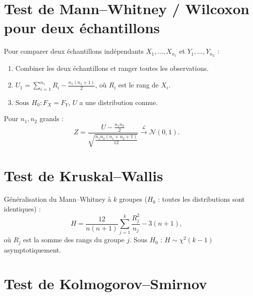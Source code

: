 \section{Test de Mann--Whitney / Wilcoxon pour deux \'echantillons}

\begin{definition}
Pour comparer deux \'echantillons ind\'ependants $X_1,\ldots,X_{n_1}$ et $Y_1,\ldots,Y_{n_2}$ :
\begin{enumerate}
\item Combiner les deux \'echantillons et ranger toutes les observations.
\item $U_1=\sum_{i=1}^{n_1} R_i - \frac{n_1(n_1+1)}{2}$, o\`u $R_i$ est le rang de $X_i$.
\item Sous $H_0:F_X=F_Y$, $U$ a une distribution connue.
\end{enumerate}
\end{definition}

\begin{theoreme}
Pour $n_1,n_2$ grands :
\[
Z = \frac{U-\frac{n_1 n_2}{2}}{\sqrt{\frac{n_1 n_2(n_1+n_2+1)}{12}}} \xrightarrow{\mathcal{L}} \mathcal{N}(0,1).
\]
\end{theoreme}

\section{Test de Kruskal--Wallis}

\begin{definition}
G\'en\'eralisation du Mann--Whitney \`a $k$ groupes ($H_0$ : toutes les distributions sont identiques) :
\[
H = \frac{12}{n(n+1)}\sum_{j=1}^k \frac{R_j^2}{n_j} - 3(n+1),
\]
o\`u $R_j$ est la somme des rangs du groupe $j$. Sous $H_0$ : $H\sim\chi^2(k-1)$ asymptotiquement.
\end{definition}

\section{Test de Kolmogorov--Smirnov}

